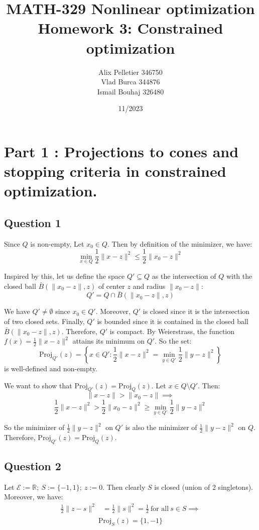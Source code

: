 \documentclass[12p]{article}
\title{MATH-329 Nonlinear optimization
Homework 3: Constrained optimization}
\author{Alix Pelletier 346750 \\ Vlad Burca 344876 \\ Ismail Bouhaj 326480}
\date{11/2023}
\newcommand*{\proj}{\text{Proj}}
\newcommand*{\es}{\mathcal{E}}
\begin{document}
\maketitle 
\section*{Part 1 : Projections to cones and stopping criteria in constrained optimization.}
\subsection*{Question 1} \hfil\par
Since \(Q\) is non-empty, Let \(x_0\in Q\). Then by definition of the minimizer, we have:
\[
  \min_{x\in Q} \frac{1}{2}\|x-z\|^2 \leq \frac{1}{2}\|x_0-z\|^2
\]

Inspired by this, let us define the space \(Q'\subseteq Q\) as the intersection of \(Q\) with the closed ball \(\bar B(\|x_0-z\|,z)\) of center \(z\) and radius \(\|x_0-z\|\):
\[
    Q'=Q\cap \bar B(\|x_0-z\|,z)  
\]

We have \(Q'\neq \emptyset\) since \(x_0\in Q'\). Moreover, \(Q'\) is closed since it is the intersection of two closed sets. Finally, \(Q'\) is bounded since it is contained in the closed ball \(\bar B(\|x_0-z\|,z)\). Therefore, \(Q'\) is compact. By Weierstrass, the function \(f(x)=\frac{1}{2}\|x-z\|^2\) attains its minimum on \(Q'\). So the set:
\[
    \proj_{Q'}(z)=\left\{x\in Q': \frac{1}{2}\|x-z\|^2=\min_{y\in Q'}\frac{1}{2}\|y-z\|^2\right\}    
\]
is well-defined and non-empty.

We want to show that \(\proj_{Q'}(z)=\proj_Q(z) \). Let \(x\in Q\setminus Q'\). Then:
\[
    \|x-z\|>\|x_0-z\|\implies 
\]
\[
    \frac{1}{2}\|x-z\|^2>\frac{1}{2}\|x_0-z\|^2\geq \min_{y\in Q'}\frac{1}{2}\|y-z\|^2
\]
 
So the minimizer of \(\frac{1}{2}\|y-z\|^2 \) on \(Q'\) is also the minimizer of \(\frac{1}{2}\|y-z\|^2\) on \(Q\). Therefore, \(\proj_{Q'}(z)=\proj_Q(z) \).

\subsection*{Question 2} 
Let \(\es:=\mathbb{R};\ S:=\{-1,1\};\ z:=0\). Then clearly \(S\) is closed (union of 2 singletons). Moreover, we have:
\begin{align*}
    \frac{1}{2}\|z-s\|^2&=\frac{1}{2}\|s\|^2=\frac{1}{2}\ \text{for all}\ s\in S \implies \\
\end{align*}
\[
    \proj_S(z)=\{1,-1\} 
\]
\end{document}
